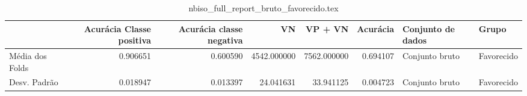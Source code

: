\begin{table}
\centering
\caption{nbiso_full_report_bruto_favorecido.tex}
\label{nbiso_full_report_bruto_favorecido.tex}
\begin{tabular}{lrrrrrll}
\toprule
{}              &  Acurácia Classe positiva &  Acurácia classe negativa &          VN  &     VP + VN  &  Acurácia & Conjunto de dados &       Grupo \\
\midrule
Média dos Folds &                  0.906651 &                  0.600590 &  4542.000000 &  7562.000000 &  0.694107 &    Conjunto bruto &  Favorecido \\
Desv. Padrão    &                  0.018947 &                  0.013397 &    24.041631 &    33.941125 &  0.004723 &    Conjunto bruto &  Favorecido \\
\bottomrule
\end{tabular}
\end{table}
